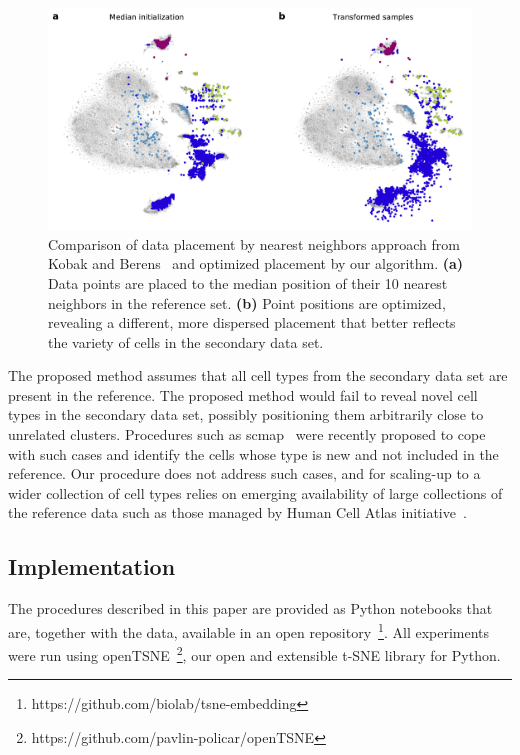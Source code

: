 \documentclass[runningheads]{llncs}
\begin{document}
\begin{figure}[htbp]
\includegraphics[width=\textwidth]{figures/optimization_retina.pdf}
\caption{Comparison of data placement by nearest neighbors approach from Kobak
and Berens~\cite{art_of_using_tsne} and optimized placement by our algorithm.
{\bf (a)} Data points are placed to the median position of their 10 nearest
neighbors in the reference set. {\bf (b)} Point positions are optimized,
revealing a different, more dispersed placement that better reflects the
variety of cells in the secondary data set.}
\label{fig:optimization}
\end{figure}

The proposed method assumes that all cell types from the secondary data set are
present in the reference. The proposed method would fail to reveal novel cell
types in the secondary data set, possibly positioning them arbitrarily close to
unrelated clusters. Procedures such as scmap~\cite{scmap} were recently
proposed to cope with such cases and identify the cells whose type is new and
not included in the reference. Our procedure does not address such cases, and
for scaling-up to a wider collection of cell types relies on emerging
availability of large collections of the reference data such as those managed
by Human Cell Atlas initiative~\cite{hca}. 

\subsection{Implementation\label{sec:implementation}}

The procedures described in this paper are provided as Python notebooks that
are, together with the data, available in an open
repository~\footnote{https://github.com/biolab/tsne-embedding}. All experiments
were run using openTSNE~\footnote{https://github.com/pavlin-policar/openTSNE},
our open and extensible t-SNE library for Python.
\end{document}
